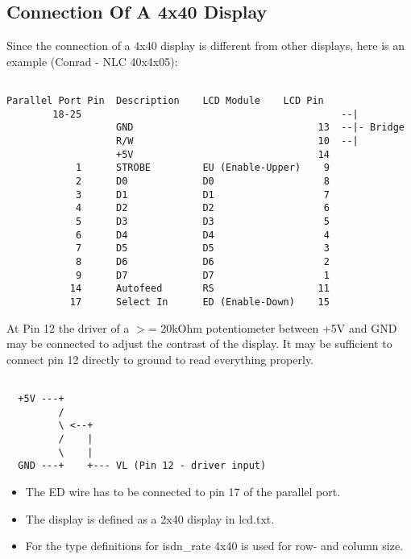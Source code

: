\subsection{Connection Of A 4x40 Display}

  Since the connection of a 4x40 display is different from other displays,
  here is an example (Conrad - NLC 40x4x05):
\begin{example}
\begin{verbatim}

Parallel Port Pin  Description    LCD Module    LCD Pin
        18-25                                             --|
                   GND                                13  --|- Bridge
                   R/W                                10  --|
                   +5V                                14
            1      STROBE         EU (Enable-Upper)    9
            2      D0             D0                   8
            3      D1             D1                   7
            4      D2             D2                   6
            5      D3             D3                   5
            6      D4             D4                   4
            7      D5             D5                   3
            8      D6             D6                   2
            9      D7             D7                   1
           14      Autofeed       RS                  11
           17      Select In      ED (Enable-Down)    15
\end{verbatim}
\end{example}


  At Pin 12 the driver of a $>$= 20kOhm potentiometer between +5V and GND may
  be connected to adjust the contrast of the display.
  It may be sufficient to connect pin 12 directly to ground 
  to read everything properly.

\begin{example}
\begin{verbatim}

  +5V ---+
         /
         \ <--+
         /    |
         \    |
  GND ---+    +--- VL (Pin 12 - driver input)
\end{verbatim}
\end{example}


  \begin{itemize}
  \item The ED wire has to be connected to pin 17 of the parallel port.
  
  \item The display is defined as a 2x40 display in lcd.txt.
  
  \item For the type definitions for isdn\_rate 4x40 is used for
	row- and column size.
  \end{itemize}


